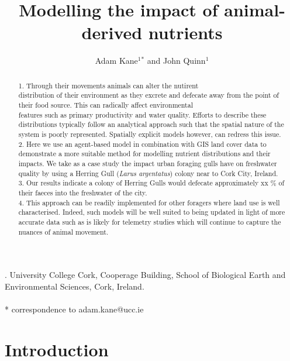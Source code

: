 \documentclass[a4paper,12pt]{article}
\title{Modelling the impact of animal-derived nutrients}
\author{Adam Kane$^1$$^*$ and John Quinn$^1$}
\begin{document}
. University College Cork, Cooperage Building, School of Biological Earth and Environmental Sciences, Cork, Ireland. 
\\ \\ * correspondence to adam.kane@ucc.ie

\newpage
\begin{abstract} 
1. Through their movements animals can alter the nutirent \\ distribution of their environment as they excrete and defecate away from the point of their food source. 
This can radically affect environmental \\ features such as primary productivity and water quality. 
Efforts to describe these distributions typically follow an analytical approach such that the spatial nature of the system is poorly represented. 
Spatially explicit models however, can redress this issue. \\

2. Here we use an agent-based model in combination with GIS land cover data to demonstrate a more suitable method for modelling nutrient distributions and their impacts. 
We take as a case study the impact urban foraging gulls have on freshwater quality by using a Herring Gull (\textit{Larus argentatus}) colony near to Cork City, Ireland. \\

3. Our results indicate a colony of Herring Gulls would defecate approximately xx \% of their faeces into the freshwater of the city. \\

4. This approach can be readily implemented for other foragers where land use is well characterised. 
Indeed, such models will be well suited to being updated in light of more accurate data such as is likely for telemetry studies which will continue to capture the nuances of animal movement.

\end{abstract}

\newpage


\section*{Introduction}
\end{document}
